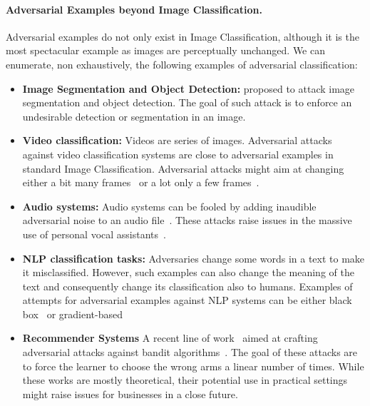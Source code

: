 \paragraph{Adversarial Examples beyond Image Classification.} Adversarial examples do not only exist in Image Classification, although it is the most spectacular example as images are perceptually unchanged. We can enumerate, non exhaustively, the following examples of adversarial classification:
\begin{itemize}
    \item \textbf{Image Segmentation and Object Detection:} \cite{xie2017adversarial} proposed to attack image segmentation and object detection. The goal of such attack is to enforce an undesirable detection or segmentation in an image. 
    \item \textbf{Video classification:} Videos are series of images. Adversarial attacks against video classification systems are close to adversarial examples in standard Image Classification. Adversarial attacks might aim at changing either a bit many frames~\citep{jiang2019black} or a lot only a few frames~\citep{mu2021sparse}. 
    \item \textbf{Audio systems:} Audio systems can be fooled by adding inaudible adversarial noise to an audio file~\citep{carlini2018audio}. These attacks raise issues in the massive use of personal vocal assistants~\citep{zhang2019dangerous}. 
    \item \textbf{NLP classification tasks:} Adversaries change some words in a text to make it misclassified. However, such examples can also change the meaning of the text and consequently change its classification also to humans. Examples of attempts for adversarial examples against NLP systems can be either black box~\citep{jin2019bert,li2020bert} or gradient-based~\citep{guo2021gradient}
    \item \textbf{Recommender Systems} A recent line of work~\cite{jun2018adversarial,liu2019data,garcelon2020adversarial} aimed at crafting adversarial attacks against bandit algorithms~\citep{lattimore2018bandit}. The goal of these attacks are to force the learner to choose the wrong arms a linear number of times. While these works are mostly theoretical, their potential use in practical settings might raise issues for businesses in a close future.
\end{itemize}



